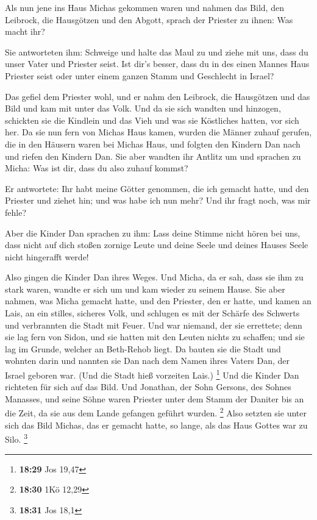  Als nun jene ins Haus Michas gekommen waren und nahmen das
Bild, den Leibrock, die Hausgötzen und den Abgott, sprach der Priester
zu ihnen: Was macht ihr?

 Sie antworteten ihm: Schweige und halte das Maul zu und
ziehe mit uns, dass du unser Vater und Priester seist. Ist dir's besser,
dass du in des einen Mannes Haus Priester seist oder unter einem ganzen
Stamm und Geschlecht in Israel?

 Das gefiel dem Priester wohl, und er nahm den Leibrock,
die Hausgötzen und das Bild und kam mit unter das Volk. 
Und da sie sich wandten und hinzogen, schickten sie die Kindlein und das
Vieh und was sie Köstliches hatten, vor sich her.  Da sie
nun fern von Michas Haus kamen, wurden die Männer zuhauf gerufen, die in
den Häusern waren bei Michas Haus, und folgten den Kindern Dan nach und
riefen den Kindern Dan.  Sie aber wandten ihr Antlitz um
und sprachen zu Micha: Was ist dir, dass du also zuhauf kommst?

 Er antwortete: Ihr habt meine Götter genommen, die ich
gemacht hatte, und den Priester und ziehet hin; und was habe ich nun
mehr? Und ihr fragt noch, was mir fehle?

 Aber die Kinder Dan sprachen zu ihm: Lass deine Stimme
nicht hören bei uns, dass nicht auf dich stoßen zornige Leute und deine
Seele und deines Hauses Seele nicht hingerafft werde!

 Also gingen die Kinder Dan ihres Weges. Und Micha, da er
sah, dass sie ihm zu stark waren, wandte er sich um und kam wieder zu
seinem Hause.  Sie aber nahmen, was Micha gemacht hatte,
und den Priester, den er hatte, und kamen an Lais, an ein stilles,
sicheres Volk, und schlugen es mit der Schärfe des Schwerts und
verbrannten die Stadt mit Feuer.  Und war niemand, der sie
errettete; denn sie lag fern von Sidon, und sie hatten mit den Leuten
nichts zu schaffen; und sie lag im Grunde, welcher an Beth-Rehob liegt.
Da bauten sie die Stadt und wohnten darin  und nannten sie
Dan nach dem Namen ihres Vaters Dan, der Israel geboren war. (Und die
Stadt hieß vorzeiten Lais.) \footnote{\textbf{18:29} Jos 19,47}
 Und die Kinder Dan richteten für sich auf das Bild. Und
Jonathan, der Sohn Gersons, des Sohnes Manasses, und seine Söhne waren
Priester unter dem Stamm der Daniter bis an die Zeit, da sie aus dem
Lande gefangen geführt wurden. \footnote{\textbf{18:30} 1Kö 12,29}
 Also setzten sie unter sich das Bild Michas, das er
gemacht hatte, so lange, als das Haus Gottes war zu Silo. \footnote{\textbf{18:31}
  Jos 18,1}

